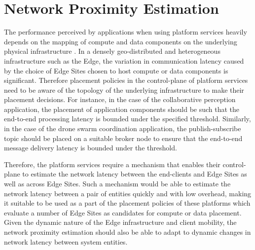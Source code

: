 \section{Network Proximity Estimation}
The performance perceived by applications when using platform services heavily depends on the mapping of compute and data components on the underlying physical infrastructure \cite{sarkar2016theoretical,amarasinghe2018data,naas2017ifogstor,liu2019mobility}. In a densely geo-distributed and heterogeneous infrastructure such as the Edge, the variation in communication latency caused by the choice of Edge Sites chosen to host compute or data components is significant. Therefore placement policies in the control-plane of platform services need to be aware of the topology of the underlying infrastructure to make their placement decisions. For instance, in the case of the collaborative perception application, the placement of application components should be such that the end-to-end processing latency is bounded under the specified threshold. Similarly, in the case of the drone swarm coordination application, the publish-subscribe topic should be placed on a suitable broker node to ensure that the end-to-end message delivery latency is bounded under the threshold.  
\par Therefore, the platform services require a mechanism that enables their control-plane to estimate the network latency between the end-clients and Edge Sites as well as across Edge Sites. Such a mechanism would be able to estimate the network latency between a pair of entities quickly and with low overhead, making it suitable to be used as a part of the placement policies of these platforms which evaluate a number of Edge Sites as candidates for compute or data placement. Given the dynamic nature of the Edge infrastructure and client mobility, the network proximity estimation should also be able to adapt to dynamic changes in network latency between system entities.

